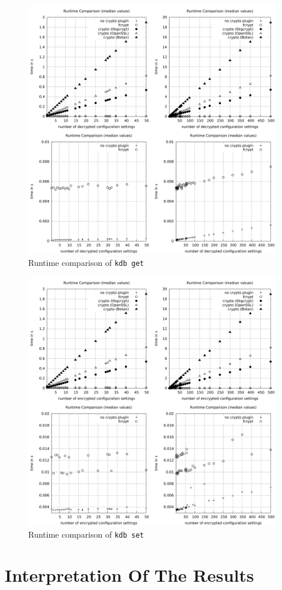\begin{figure}[h]
\center
\caption{Runtime comparison of \texttt{kdb get}}
\label{eval-runtime-comp-get}
\includegraphics[width=\columnwidth]{plots/comp_median_get.pdf}
\end{figure}

\begin{figure}[h]
\center
\caption{Runtime comparison of \texttt{kdb set}}
\label{eval-runtime-comp-set}
\includegraphics[width=\columnwidth]{plots/comp_median_set.pdf}
\end{figure}





\section{Interpretation Of The Results}



